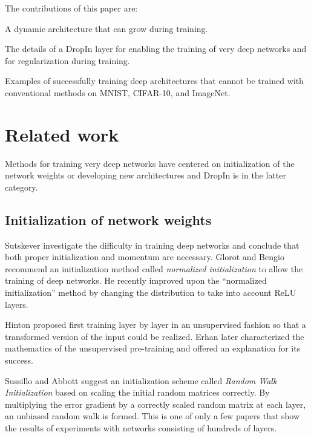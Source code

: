 \documentclass[10pt,twocolumn,letterpaper]{article}
\newcommand{\dropin}{DropIn }
\begin{document}
The contributions of this paper are:
\begin{enumerate*}
  \vspace{-10pt}
\item A dynamic architecture that can grow during training.  
\item The details of a \dropin layer for enabling the training of very deep networks and for regularization during training.  
\item Examples of successfully training deep architectures that cannot be trained with conventional methods on MNIST, CIFAR-10, and ImageNet.
\end{enumerate*}



\section{Related work}
Methods for training very deep networks  have centered on initialization of the network weights or developing new architectures and \dropin is in the latter category.  


\subsection{Initialization of network weights}
Sutskever \etal \cite{sutskever2013importance} investigate the difficulty in training deep networks and conclude that both proper initialization and momentum are necessary.  Glorot and Bengio \cite{glorot2010understanding} recommend an initialization method called \textit{normalized initialization} to allow the training of deep networks.  
He \etal \cite{he2015delving} recently improved  upon the ``normalized initialization'' method by changing the distribution to take into account ReLU layers.  

Hinton \etal \cite{hinton2006fast} proposed first training layer by layer in an unsupervised fashion so that a transformed version of the input could be realized.  
Erhan  \cite{erhan2009difficulty} later characterized the mathematics of the unsupervised pre-training and offered an explanation for its success.   

Sussillo and Abbott \cite{sussillo2015random} suggest an initialization scheme called \textit{Random Walk Initialization} based on scaling the initial random matrices correctly.  
By multiplying the error gradient by a correctly scaled random matrix at each layer, an unbiased  random walk is formed.  
This is one of only a few papers that show the results of experiments with networks consisting of hundreds of layers.  
\end{document}
